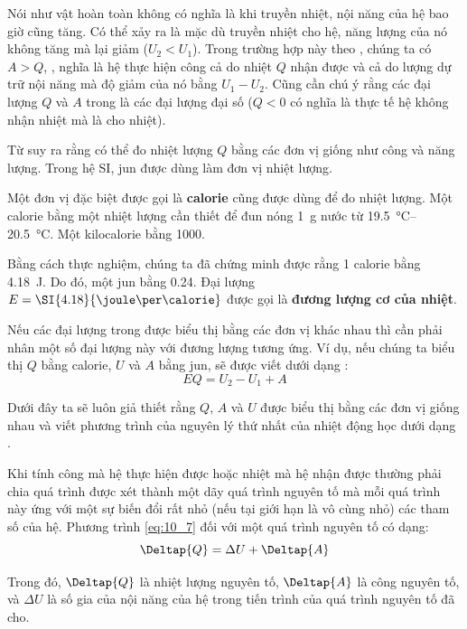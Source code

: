 Nói như vật hoàn toàn không có nghĩa là khi truyền nhiệt, nội năng của hệ bao giờ cũng tăng. Có thể xảy ra là mặc dù truyền nhiệt cho hệ, năng lượng của nó không tăng mà lại giảm ($U_2<U_1$). Trong trường hợp này theo , chúng ta có $A>Q$, \ie, nghĩa là hệ thực hiện công cả do nhiệt $Q$ nhận được và cả do lượng dự trữ nội năng mà độ giảm của nó bằng $U_1-U_2$. Cũng cần chú ý rằng các đại lượng $Q$ và $A$ trong  là các đại lượng đại số ($Q<0$ có nghĩa là thực tế hệ không nhận nhiệt mà là cho nhiệt).

Từ  suy ra rằng có thể đo nhiệt lượng $Q$ bằng các đơn vị giống như công và năng lượng. Trong hệ SI, jun được dùng làm đơn vị nhiệt lượng.

Một đơn vị đặc biệt được gọi là \textbf{calorie} cũng được dùng để đo nhiệt lượng. Một calorie bằng một nhiệt lượng cần thiết để đun nóng \SI{1}{\gram} nước từ \SIrange{19.5}{20.5}{\degreeCelsius}. Một kilocalorie bằng \SI{1000}{\calorie}.

Bằng cách thực nghiệm, chúng ta đã chứng minh được rằng 1 calorie bằng \SI{4.18}{\joule}. Do đó, một jun bằng \SI{0.24}{\calorie}. Đại lượng $E=\SI{4.18}{\joule\per\calorie}$ được gọi là \textbf{đương lượng cơ của nhiệt}.

Nếu các đại lượng trong  được biểu thị bằng các đơn vị khác nhau thì cần phải nhân một số đại lượng này với đương lượng tương ứng. Ví dụ, nếu chúng ta biểu thị $Q$ bằng calorie, $U$ và $A$ bằng jun,  sẽ được viết dưới dạng :
\begin{equation*}
	EQ = U_2 - U_1 + A
\end{equation*}

Dưới đây ta sẽ luôn giả thiết rằng $Q$, $A$ và $U$ được biểu thị bằng các đơn vị giống nhau và viết phương trình của nguyên lý thứ nhất của nhiệt động học dưới dạng .

Khi tính công mà hệ thực hiện được hoặc nhiệt mà hệ nhận được thường phải chia quá trình được xét thành một dãy quá trình nguyên tố mà mỗi quá trình này ứng với một sự biến đổi rất nhỏ (nếu tại giới hạn là vô cùng nhỏ) các tham số của hệ. Phương trình \eqref{eq:10_7} đối với một quá trình nguyên tố có dạng:
\begin{equation}\label{eq:10_8}
	\Deltap{Q} = \Delta U + \Deltap{A}
\end{equation}

\noindent
Trong đó, $\Deltap{Q}$ là nhiệt lượng nguyên tố, $\Deltap{A}$ là công nguyên tố, và $\Delta U$ là số gia của nội năng của hệ trong tiến trình của quá trình nguyên tố đã cho.

